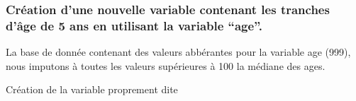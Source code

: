 \documentclass[
]{article}
\newenvironment{Shaded}{\begin{snugshade}}{\end{snugshade}}
\newcommand{\AttributeTok}[1]{\textcolor[rgb]{0.13,0.29,0.53}{#1}}
\newcommand{\CommentTok}[1]{\textcolor[rgb]{0.56,0.35,0.01}{\textit{#1}}}
\newcommand{\DecValTok}[1]{\textcolor[rgb]{0.00,0.00,0.81}{#1}}
\newcommand{\FunctionTok}[1]{\textcolor[rgb]{0.13,0.29,0.53}{\textbf{#1}}}
\newcommand{\NormalTok}[1]{#1}
\newcommand{\OtherTok}[1]{\textcolor[rgb]{0.56,0.35,0.01}{#1}}
\newcommand{\SpecialCharTok}[1]{\textcolor[rgb]{0.81,0.36,0.00}{\textbf{#1}}}
\begin{document}
\hypertarget{cruxe9ation-dune-nouvelle-variable-contenant-les-tranches-duxe2ge-de-5-ans-en-utilisant-la-variable-age.}{%
\subsubsection{Création d'une nouvelle variable contenant les tranches
d'âge de 5 ans en utilisant la variable
``age''.}\label{cruxe9ation-dune-nouvelle-variable-contenant-les-tranches-duxe2ge-de-5-ans-en-utilisant-la-variable-age.}}

La base de donnée contenant des valeurs abbérantes pour la variable age
(999), nous imputons à toutes les valeurs supérieures à 100 la médiane
des ages.

\begin{Shaded}
\end{Shaded}

Création de la variable proprement dite
\end{document}
